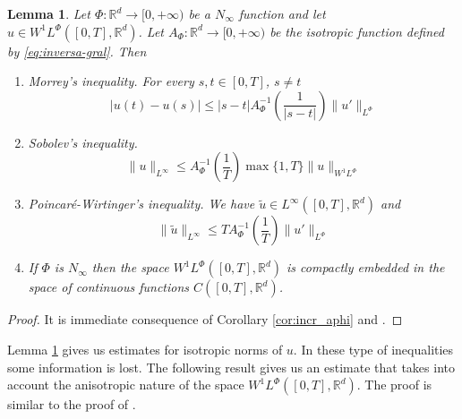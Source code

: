 \documentclass[twoside]{article}
\newtheorem{lem}[thm]{Lemma}
\theoremstyle{remark}
\newcommand{\orlnor}{\|_{L^{\Phi}}}
\newcommand{\linf}{\|_{L^{\infty}}}
\newcommand{\lphi}{L^{\Phi}}
\newcommand{\wphi}{W^{1}\lphi}
\newcommand{\sobnor}{\|_{W^{1}\lphi}}
\newcommand{\rr}{\mathbb{R}}
\renewcommand{\leq}{\leqslant}
\begin{document}
\begin{lem}\label{lem:inclusion orlicz} Let $\Phi:\rr^d\to [0,+\infty)$ be a $N_{\infty}$
function and let \linebreak[4]$u\in\wphi\left([0,T],\rr^d\right)$. Let 
$A_{\Phi}: \rr^d \to  [0,+\infty)$ be the isotropic function defined by \eqref{eq:inversa-gral}. Then
 
\begin{enumerate}
  \item \emph{Morrey's inequality}.   For every $s,t\in [0,T]$, $s\neq t$
  \begin{equation}
   |u(t)-u(s)| \leq
  |s-t|A_{\Phi}^{-1}\left(\frac{1}{|s-t|}\right)\|u'\orlnor\tag{M.I}\label{in-sob-cont}
  \end{equation}

  \item \emph{Sobolev's inequality}. 
  \begin{equation}
   \|u\linf \leq A_\Phi^{-1}\left(\frac{1}{T}\right)\max\{1,T\}\|u\sobnor\tag{S.I}\label{eq:sobolev}
  \end{equation}

  \item \emph{Poincar\'e-Wirtinger's inequality}. We have $\widetilde{u}\in L^{\infty}\left([0,T],\rr^d\right)$ and 
    \begin{equation}\label{eq:wirtinger-iso}
    \|\widetilde{u}\|_{L^{\infty}} \leq T A_{\Phi}^{-1}\left(\frac{1}{T}\right)\| u'\orlnor\tag{P-W.I}
    \end{equation}
    
    \item\label{it:embeding} If $\Phi$ is $N_{\infty}$ then the space $\wphi\left([0,T],\rr^d\right)$ is compactly embedded in the space of  continuous functions $C([0,T],\rr^d)$.
  \end{enumerate}

\end{lem}

\begin{proof}  It is immediate consequence of Corollary \ref{cor:incr_aphi} and \cite[Lemma 2.1, Corollary 2.2]{ABGMS2015}.
\end{proof}

Lemma \ref{lem:inclusion orlicz} gives us estimates for isotropic norms of $u$. In these type of inequalities some information is lost.  The following result gives us an estimate that takes into account the anisotropic nature of the space $\wphi\left([0,T],\rr^d\right)$. The proof is similar to  the proof of  \cite[Th. 4.5]{chamra2017anisotropic}.
\end{document}
